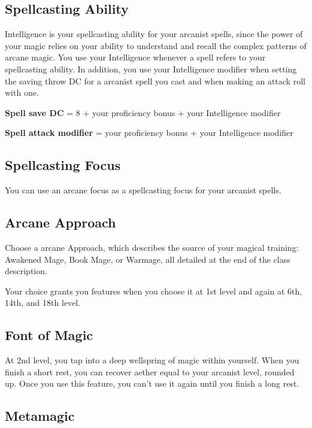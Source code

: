 \subsection{Spellcasting Ability}

Intelligence is your spellcasting ability for your arcanist spells, since the power of your magic relies on your ability to understand and recall the complex patterns of arcane magic. You use your Intelligence whenever a spell refers to your spellcasting ability. In addition, you use your Intelligence modifier when setting the saving throw DC for a arcanist spell you cast and when making an attack roll with one.

\textbf{Spell save DC} = 8 + your proficiency bonus + your Intelligence modifier

\textbf{Spell attack modifier} = your proficiency bonus + your Intelligence modifier

\subsection{Spellcasting Focus}

You can use an arcane focus as a spellcasting focus for your arcanist spells.

\subsection{Arcane Approach}

Choose a arcane Approach, which describes the source of your magical training: Awakened Mage, Book Mage, or Warmage, all detailed at the end of the class description.

Your choice grants you features when you choose it at 1st level and again at 6th, 14th, and 18th level.

\subsection{Font of Magic}

At 2nd level, you tap into a deep wellspring of magic within yourself. When you finish a short rest, you can recover aether equal to your arcanist level, rounded up. Once you use this feature, you can't use it again until you finish a long rest.

\subsection{Metamagic}

